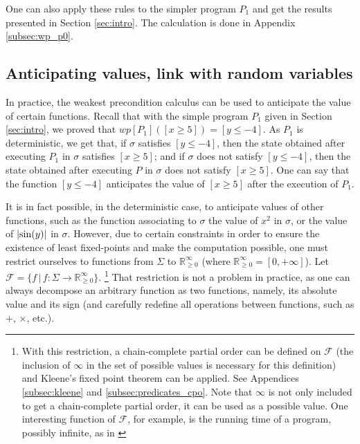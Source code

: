 \documentclass[a4paper,10pt]{llncs}
\def\RRposi {{\mathbb R_{\geq 0}^{\infty}}}
\begin{document}
	One can also apply these rules to the simpler program $P_1$ and get the results presented in Section \ref{sec:intro}. The calculation is done in Appendix \ref{subsec:wp_p0}.
	
	\subsection{Anticipating values, link with random variables}
    \label{subsec:anticipation}
    
	In practice, the weakest precondition calculus can be used to anticipate the value of certain functions. Recall that with the simple program $P_1$ given in Section \ref{sec:intro}, we proved that $wp[P_1]([x \geq 5]) = [y \leq -4]$. As $P_1$ is deterministic, we get that, if $\sigma$ satisfies $[y \leq -4]$, then the state obtained after executing $P_1$ in $\sigma$ satisfies $[x \geq 5]$; and if $\sigma$ does not satisfy $[y \leq -4]$, then the state obtained after executing $P$ in $\sigma$ does not satisfy $[x \geq 5]$. One can say that the function $[y \leq -4]$ anticipates the value of $[x \geq 5]$ after the execution of $P_1$.
	
It is in fact possible, in the deterministic case, to anticipate values of other functions, such as the function associating to $\sigma$ the value of $x^2$ in $\sigma$, or the value of $|\textnormal{sin}(y)|$ in $\sigma$.\cite{Winskel93} However, due to certain constraints in order to ensure the existence of least fixed-points and make the computation possible, one must restrict ourselves to functions from $\Sigma$ to $\RRposi$ (where $\RRposi = [0,+\infty]$). Let $\mathcal{F} = \{f \,|\, f : \Sigma \rightarrow \RRposi \}$. \footnote{With this restriction, a chain-complete partial order can be defined on $\mathcal{F}$ (the inclusion of $\infty$ in the set of possible values is necessary for this definition) and Kleene's fixed point theorem can be applied. See Appendices \ref{subsec:kleene} and \ref{subsec:predicates_cpo}. Note that $\infty$ is not only included to get a chain-complete partial order, it can be used as a possible value. One interesting function of $\mathcal{F}$, for example, is the running time of a program, possibly infinite, as in \cite{Kaminski16}} That restriction is not a problem in practice, as one can always decompose an arbitrary function as two functions, namely, its absolute value and its sign (and carefully redefine all operations between functions, such as $+$, $\times$, etc.).
\end{document}
